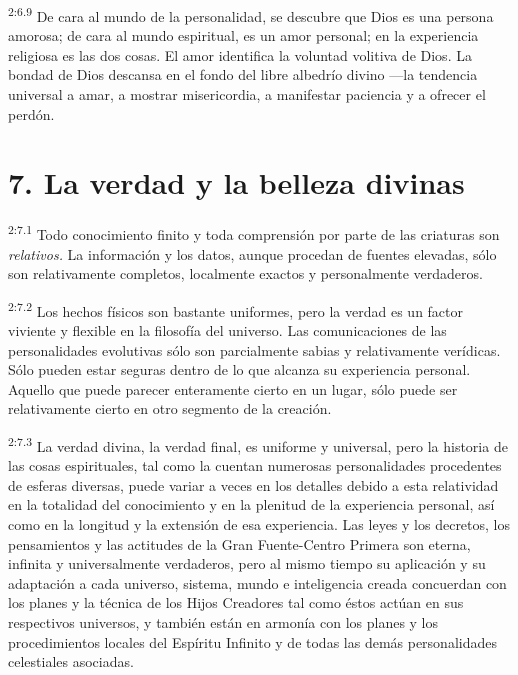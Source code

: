 \par
\textsuperscript{2:6.9} De cara al mundo de la personalidad, se descubre que Dios es una persona amorosa; de cara al mundo espiritual, es un amor personal; en la experiencia religiosa es las dos cosas. El amor identifica la voluntad volitiva de Dios. La bondad de Dios descansa en el fondo del libre albedrío divino ---la tendencia universal a amar, a mostrar misericordia, a manifestar paciencia y a ofrecer el perdón.

\section*{7. La verdad y la belleza divinas}
\par
\textsuperscript{2:7.1} Todo conocimiento finito y toda comprensión por parte de las criaturas son \textit{relativos.} La información y los datos, aunque procedan de fuentes elevadas, sólo son relativamente completos, localmente exactos y personalmente verdaderos.

\par
\textsuperscript{2:7.2} Los hechos físicos son bastante uniformes, pero la verdad es un factor viviente y flexible en la filosofía del universo. Las comunicaciones de las personalidades evolutivas sólo son parcialmente sabias y relativamente verídicas. Sólo pueden estar seguras dentro de lo que alcanza su experiencia personal. Aquello que puede parecer enteramente cierto en un lugar, sólo puede ser relativamente cierto en otro segmento de la creación.

\par
\textsuperscript{2:7.3} La verdad divina, la verdad final, es uniforme y universal, pero la historia de las cosas espirituales, tal como la cuentan numerosas personalidades procedentes de esferas diversas, puede variar a veces en los detalles debido a esta relatividad en la totalidad del conocimiento y en la plenitud de la experiencia personal, así como en la longitud y la extensión de esa experiencia. Las leyes y los decretos, los pensamientos y las actitudes de la Gran Fuente-Centro Primera son eterna, infinita y universalmente verdaderos, pero al mismo tiempo su aplicación y su adaptación a cada universo, sistema, mundo e inteligencia creada concuerdan con los planes y la técnica de los Hijos Creadores tal como éstos actúan en sus respectivos universos, y también están en armonía con los planes y los procedimientos locales del Espíritu Infinito y de todas las demás personalidades celestiales asociadas.

